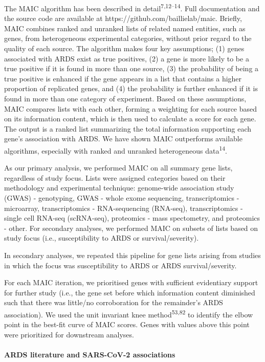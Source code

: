 \documentclass[
  11,
  a4paper,
]{article}
\let\oldparagraph\paragraph
\renewcommand{\paragraph}[1]{\oldparagraph{#1}\mbox{}}
\begin{document}
The MAIC algorithm has been described in
detail\textsuperscript{7,12--14}. Full documentation and the source code
are available at https://github.com/baillielab/maic. Briefly, MAIC
combines ranked and unranked lists of related named entities, such as
genes, from heterogeneous experimental categories, without prior regard
to the quality of each source. The algorithm makes four key assumptions;
(1) genes associated with ARDS exist as true positives, (2) a gene is
more likely to be a true positive if it is found in more than one
source, (3) the probability of being a true positive is enhanced if the
gene appears in a list that contains a higher proportion of replicated
genes, and (4) the probability is further enhanced if it is found in
more than one category of experiment. Based on these assumptions, MAIC
compares lists with each other, forming a weighting for each source
based on its information content, which is then used to calculate a
score for each gene. The output is a ranked list summarizing the total
information supporting each gene's association with ARDS. We have shown
MAIC outperforms available algorithms, especially with ranked and
unranked heterogeneous data\textsuperscript{14}.

As our primary analysis, we performed MAIC on all summary gene lists,
regardless of study focus. Lists were assigned categories based on their
methodology and experimental technique: genome-wide association study
(GWAS) - genotyping, GWAS - whole exome sequencing, transcriptomics -
microarray, transcriptomics - RNA-sequencing (RNA-seq), transcriptomics
- single cell RNA-seq (scRNA-seq), proteomics - mass spectometry, and
proteomics - other. For secondary analyses, we performed MAIC on subsets
of lists based on study focus (i.e., susceptibility to ARDS or
survival/severity).

In secondary analyses, we repeated this pipeline for gene lists arising
from studies in which the focus was susceptibility to ARDS or ARDS
survival/severity.

For each MAIC iteration, we prioritised genes with sufficient
evidentiary support for further study (i.e., the gene set before which
information content diminished such that there was little/no
corroboration for the remainder's ARDS association). We used the unit
invariant knee method\textsuperscript{53,82} to identify the elbow point
in the best-fit curve of MAIC scores. Genes with values above this point
were prioritized for downstream analyses.

\hypertarget{ards-literature-and-sars-cov-2-associations}{%
\paragraph{ARDS literature and SARS-CoV-2
associations}\label{ards-literature-and-sars-cov-2-associations}}
\end{document}
